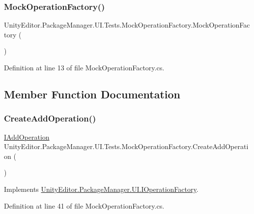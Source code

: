 \subsubsection{\texorpdfstring{MockOperationFactory()}{MockOperationFactory()}}
{\footnotesize\ttfamily Unity\+Editor.\+Package\+Manager.\+U\+I.\+Tests.\+Mock\+Operation\+Factory.\+Mock\+Operation\+Factory (\begin{DoxyParamCaption}{ }\end{DoxyParamCaption})}



Definition at line 13 of file Mock\+Operation\+Factory.\+cs.



\subsection{Member Function Documentation}
\mbox{\label{class_unity_editor_1_1_package_manager_1_1_u_i_1_1_tests_1_1_mock_operation_factory_a9c4cf5b39d2c0b78864aa0609a60a21d}} 
\subsubsection{\texorpdfstring{CreateAddOperation()}{CreateAddOperation()}}
{\footnotesize\ttfamily \mbox{\hyperlink{interface_unity_editor_1_1_package_manager_1_1_u_i_1_1_i_add_operation}{I\+Add\+Operation}} Unity\+Editor.\+Package\+Manager.\+U\+I.\+Tests.\+Mock\+Operation\+Factory.\+Create\+Add\+Operation (\begin{DoxyParamCaption}{ }\end{DoxyParamCaption})}



Implements \mbox{\hyperlink{interface_unity_editor_1_1_package_manager_1_1_u_i_1_1_i_operation_factory_a50ed4e82d0709f835d61b47331a464ac}{Unity\+Editor.\+Package\+Manager.\+U\+I.\+I\+Operation\+Factory}}.



Definition at line 41 of file Mock\+Operation\+Factory.\+cs.

\mbox{\label{class_unity_editor_1_1_package_manager_1_1_u_i_1_1_tests_1_1_mock_operation_factory_a23ac4569326a62c4913e285446e6e933}} 
